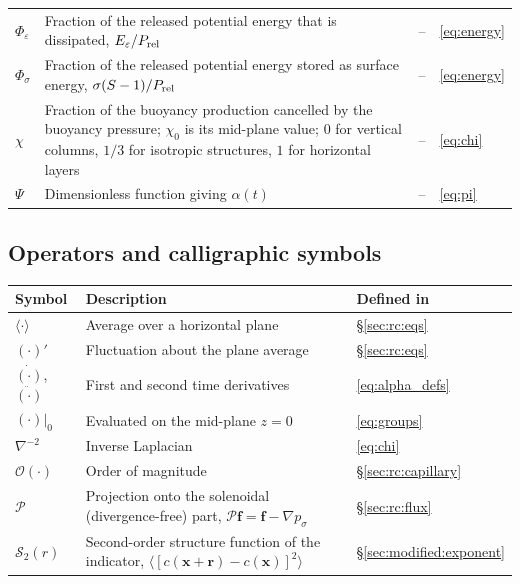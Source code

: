 \documentclass[11pt]{article}
\numberwithin{equation}{section}
\newcommand{\avg}[1]{\langle #1\rangle}
\begin{document}
\begin{longtable}{@{}P{0.13}P{0.53}P{0.13}P{0.13}@{}}
$\Phi_\varepsilon$ & Fraction of the released potential energy that is dissipated, $E_\varepsilon/P_{\rm rel}$ & -- & \eqref{eq:energy}\\
$\Phi_\sigma$ & Fraction of the released potential energy stored as surface energy, $\sigma(S - 1)/P_{\rm rel}$ & -- & \eqref{eq:energy}\\
$\chi$ & Fraction of the buoyancy production cancelled by the buoyancy pressure; $\chi_0$ is its mid-plane value; $0$ for vertical columns, $1/3$ for isotropic structures, $1$ for horizontal layers & -- & \eqref{eq:chi}\\
$\Psi$ & Dimensionless function giving $\alpha(t)$ & -- & \eqref{eq:pi}\\
\end{longtable}

\subsection*{Operators and calligraphic symbols}
\begin{longtable}{@{}P{0.13}P{0.66}P{0.13}@{}}
\toprule
Symbol & Description & Defined in\\
\midrule
\endhead
\bottomrule
\endfoot
$\avg{\cdot}$ & Average over a horizontal plane & \S\ref{sec:rc:eqs}\\
$(\cdot)'$ & Fluctuation about the plane average & \S\ref{sec:rc:eqs}\\
$\dot{(\cdot)}$, $\ddot{(\cdot)}$ & First and second time derivatives & \eqref{eq:alpha_defs}\\
$(\cdot) |_0$ & Evaluated on the mid-plane $z = 0$ & \eqref{eq:groups}\\
$\nabla^{-2}$ & Inverse Laplacian & \eqref{eq:chi}\\
$\mathcal{O}(\cdot)$ & Order of magnitude & \S\ref{sec:rc:capillary}\\
$\mathcal P$ & Projection onto the solenoidal (divergence-free) part, $\mathcal P \mathbf f = \mathbf f - \nabla p_\sigma$ & \S\ref{sec:rc:flux}\\
$\mathcal{S}_2(r)$ & Second-order structure function of the indicator, $\avg{[c(\mathbf x + \mathbf r) - c(\mathbf x)]^2}$ & \S\ref{sec:modified:exponent}\\
\end{longtable}
\end{document}
